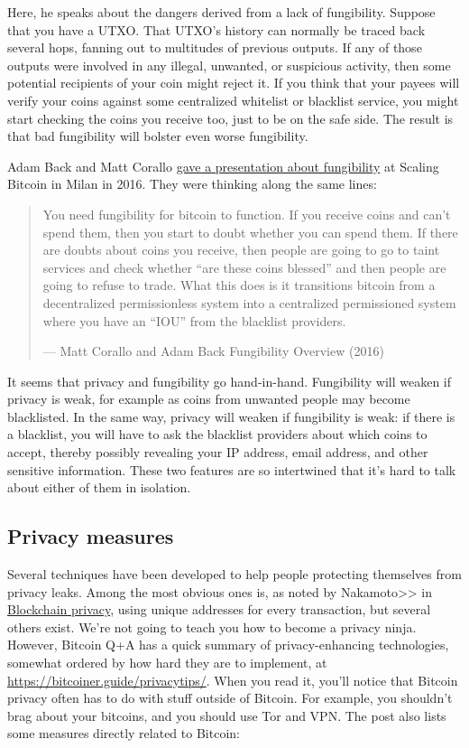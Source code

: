 Here, he speaks about the dangers derived from a lack of fungibility.
Suppose that you have a UTXO. That UTXO's history can normally be traced
back several hops, fanning out to multitudes of previous outputs. If any
of those outputs were involved in any illegal, unwanted, or suspicious
activity, then some potential recipients of your coin might reject it.
If you think that your payees will verify your coins against some
centralized whitelist or blacklist service, you might start checking the
coins you receive too, just to be on the safe side. The result is that
bad fungibility will bolster even worse fungibility.

Adam Back and Matt Corallo
\href{https://btctranscripts.com/scalingbitcoin/milan-2016/fungibility-overview/}{gave
a presentation about fungibility} at Scaling Bitcoin in Milan in 2016.
They were thinking along the same lines:

\begin{quote}
You need fungibility for bitcoin to function. If you receive coins and
can't spend them, then you start to doubt whether you can spend them. If
there are doubts about coins you receive, then people are going to go to
taint services and check whether ``are these coins blessed'' and then
people are going to refuse to trade. What this does is it transitions
bitcoin from a decentralized permissionless system into a centralized
permissioned system where you have an ``IOU'' from the blacklist
providers.

---  Matt Corallo and Adam Back Fungibility Overview (2016)
\end{quote}

It seems that privacy and fungibility go hand-in-hand. Fungibility will
weaken if privacy is weak, for example as coins from unwanted people may
become blacklisted. In the same way, privacy will weaken if fungibility
is weak: if there is a blacklist, you will have to ask the blacklist
providers about which coins to accept, thereby possibly revealing your
IP address, email address, and other sensitive information. These two
features are so intertwined that it's hard to talk about either of them
in isolation.

\hypertarget{privacymeasures}{%
\subsection{Privacy measures}\label{privacymeasures}}

Several techniques have been developed to help people protecting
themselves from privacy leaks. Among the most obvious ones is, as noted
by Nakamoto\textgreater\textgreater{} in
\protect\hyperlink{blockchainprivacy}{Blockchain privacy}, using unique
addresses for every transaction, but several others exist. We're not
going to teach you how to become a privacy ninja. However, Bitcoin Q+A
has a quick summary of privacy-enhancing technologies, somewhat ordered
by how hard they are to implement, at
\url{https://bitcoiner.guide/privacytips/}. When you read it, you'll
notice that Bitcoin privacy often has to do with stuff outside of
Bitcoin. For example, you shouldn't brag about your bitcoins, and you
should use Tor and VPN. The post also lists some measures directly
related to Bitcoin:

